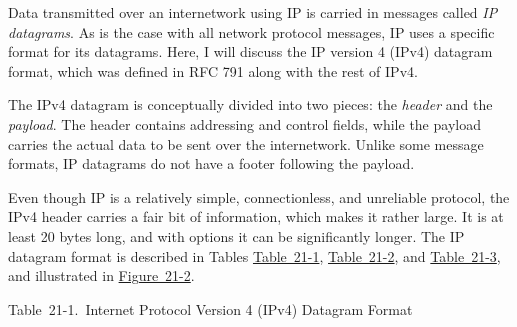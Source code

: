 Data transmitted over an internetwork using IP is carried in messages
called \emph{IP datagrams}. As is the case with all network protocol
messages, IP uses a specific
format for
its datagrams. Here, I will discuss the IP version 4 (IPv4) datagram
format,
which was defined in RFC 791 along with the rest of IPv4.

The IPv4 datagram is conceptually divided into two pieces: the
\emph{header} and the \emph{payload}. The header contains addressing
and control fields, while the payload carries the actual data to be sent
over the internetwork. Unlike some message formats, IP datagrams do not
have a footer following the payload.

Even though IP is a relatively simple, connectionless, and unreliable
protocol, the IPv4 header carries a fair bit of information, which makes
it rather large. It is at least 20 bytes long, and with options it can
be significantly longer. The IP datagram format is described in Tables
\protect\hyperlink{ch21s02.htmlux5cux23internet_protocol_version__ipv_datagram}{Table~21-1},
\protect\hyperlink{ch21s02.htmlux5cux23ipv_flags_subfields}{Table~21-2},
and
\protect\hyperlink{ch21s02.htmlux5cux23ipv_protocol_subfields}{Table~21-3},
and illustrated in
\protect\hyperlink{ch21s02.htmlux5cux23ipv4_datagram_format_this_diagram_shows_}{Figure~21-2}.



Table~21-1.~Internet Protocol Version 4 (IPv4) Datagram Format

